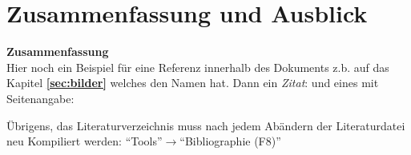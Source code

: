 \section{Zusammenfassung und Ausblick}
\label{sec:zusammenfassung}

\textbf{Zusammenfassung}\vspace{1mm}\\
Hier noch ein Beispiel für eine Referenz innerhalb des Dokuments z.b. auf das Kapitel \textbf{\ref{sec:bilder}} welches den Namen \textbf{} hat. Dann ein \textit{Zitat}: \cite{Einstein1905} und eines mit Seitenangabe: \cite[92]{Einstein1905}

Übrigens, das Literaturverzeichnis muss nach jedem Abändern der Literaturdatei neu Kompiliert werden: "`Tools"'$\rightarrow$"`Bibliographie (F8)"'

\clearpage